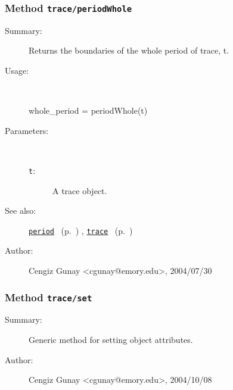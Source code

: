 \subsubsection[Method \texttt{periodWhole}]{Method \texttt{trace/periodWhole}}%
%
\label{ref_trace__periodWhole}%
\hypertarget{ref_trace__periodWhole}{}%
\begin{description}
\item[Summary:]Returns the boundaries of the whole period of trace, t. 
%
\item[Usage:]~%
\begin{lyxcode}%
whole\_period = periodWhole(t)
%
\end{lyxcode}%
%
%
\item[Parameters:]~
\begin{description}%
\item[\texttt{t}:]
 A trace object.
\end{description}%
%
%
%
\item[See also:]%
\hyperlink{ref_period}{\texttt{period}}%
\ (p.~\pageref{ref_period})%
%
, \hyperlink{ref_trace}{\texttt{trace}}%
\ (p.~\pageref{ref_trace})%
%
%
\item[Author:]%
Cengiz Gunay <cgunay@emory.edu>, 2004/07/30%
\end{description}
\methodline%
\subsubsection[Method \texttt{set}]{Method \texttt{trace/set}}%
%
\label{ref_trace__set}%
\hypertarget{ref_trace__set}{}%
\begin{description}
\item[Summary:]Generic method for setting object attributes.
%
%
%
%
%
%
%
\item[Author:]%
Cengiz Gunay <cgunay@emory.edu>, 2004/10/08%
\end{description}
\methodline%
